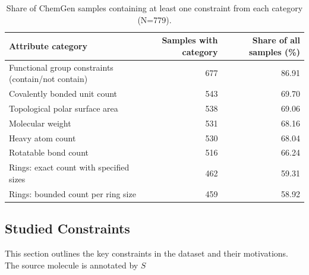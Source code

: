 \documentclass[10pt]{article} %
\begin{document}
    \begin{table}[h]
        \centering
        \small
        \begin{tabular}{lrr}
            \toprule
            \textbf{Attribute category} & \textbf{Samples with category} & \textbf{Share of all samples (\%)} \\
            \midrule
            Functional group constraints (contain/not contain) & 677 & 86.91 \\
            Covalently bonded unit count & 543 & 69.70 \\
            Topological polar surface area & 538 & 69.06 \\
            Molecular weight & 531 & 68.16 \\
            Heavy atom count & 530 & 68.04 \\
            Rotatable bond count & 516 & 66.24 \\
            Rings: exact count with specified sizes & 462 & 59.31 \\
            Rings: bounded count per ring size & 459 & 58.92 \\
            \bottomrule
        \end{tabular}
        \caption{Share of ChemGen samples containing at least one constraint from each category (N=779).}
        \label{tab:chemgen_sample_category_share}
    \end{table}
    
    \subsection{Studied Constraints}
    \label{app:studied_att}
    This section outlines the key constraints in the dataset and their motivations. The source molecule is annotated by $S$
    
\end{document}
